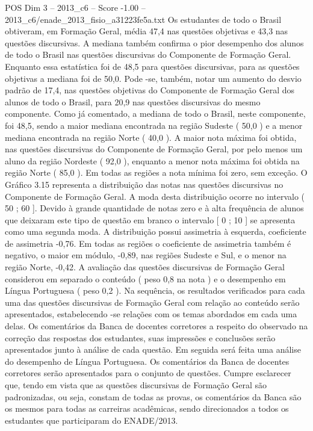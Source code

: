 \begin{textsample}{POS Dim 3 – 2013\_c6 – Score -1.00 – 2013\_c6/enade\_2013\_fisio\_a31223fe5a.txt}
Os estudantes de todo o Brasil obtiveram, em Formação Geral, média 47,4 nas questões objetivas e 43,3 nas questões discursivas.
A mediana também confirma o pior desempenho dos alunos de todo o Brasil nas questões discursivas do Componente de Formação Geral.
Enquanto essa estatística foi de 48,5 para questões discursivas, para as questões objetivas a mediana foi de 50,0.
Pode -se, também, notar um aumento do desvio padrão de 17,4, nas questões objetivas do Componente de Formação Geral dos alunos de todo o Brasil, para 20,9 nas questões discursivas do mesmo componente.
Como já comentado, a mediana de todo o Brasil, neste componente, foi 48,5, sendo a maior mediana encontrada na região Sudeste ( 50,0 ) e a menor mediana encontrada na região Norte ( 40,0 ).
A maior nota máxima foi obtida, nas questões discursivas do Componente de Formação Geral, por pelo menos um aluno da região Nordeste ( 92,0 ), enquanto a menor nota máxima foi obtida na região Norte ( 85,0 ).
Em todas as regiões a nota mínima foi zero, sem exceção.
O Gráfico 3.15 representa a distribuição das notas nas questões discursivas no Componente de Formação Geral.
A moda desta distribuição ocorre no intervalo ( 50 ; 60 ].
Devido à grande quantidade de notas zero e à alta frequência de alunos que deixaram este tipo de questão em branco o intervalo [ 0 ; 10 ] se apresenta como uma segunda moda.
A distribuição possui assimetria à esquerda, coeficiente de assimetria -0,76.
Em todas as regiões o coeficiente de assimetria também é negativo, o maior em módulo, -0,89, nas regiões Sudeste e Sul, e o menor na região Norte, -0,42.
A avaliação das questões discursivas de Formação Geral considerou em separado o conteúdo ( peso 0,8 na nota ) e o desempenho em Língua Portuguesa ( peso 0,2 ).
Na sequência, os resultados verificados para cada uma das questões discursivas de Formação Geral com relação ao conteúdo serão apresentados, estabelecendo -se relações com os temas abordados em cada uma delas.
Os comentários da Banca de docentes corretores a respeito do observado na correção das respostas dos estudantes, suas impressões e conclusões serão apresentados junto à análise de cada questão.
Em seguida será feita uma análise do desempenho de Língua Portuguesa.
Os comentários da Banca de docentes corretores serão apresentados para o conjunto de questões.
Cumpre esclarecer que, tendo em vista que as questões discursivas de Formação Geral são padronizadas, ou seja, constam de todas as provas, os comentários da Banca são os mesmos para todas as carreiras acadêmicas, sendo direcionados a todos os estudantes que participaram do ENADE/2013.

\end{textsample}
